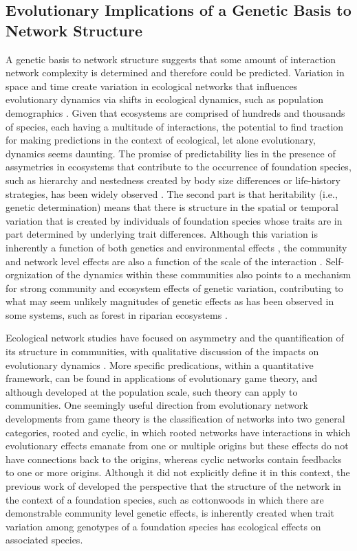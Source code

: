 \documentclass[fleqn,12pt]{olplainarticle}
\begin{document}
\subsection*{Evolutionary Implications of a Genetic Basis to Network Structure}

A genetic basis to network structure suggests that some amount of
interaction network complexity is determined and therefore could be
predicted. Variation in space and time create variation in ecological
networks that influences evolutionary dynamics via shifts in
ecological dynamics, such as population demographics
\cite{Guimaraes2020TheOrganization}. Given that ecosystems are
comprised of hundreds and thousands of species, each having a
multitude of interactions, the potential to find traction for making
predictions in the context of ecological, let alone evolutionary,
dynamics seems daunting. The promise of predictability lies in the
presence of assymetries in ecosystems that contribute to the
occurrence of foundation species, such as hierarchy and nestedness
created by body size differences or life-history strategies, has been
widely observed \cite{Ellison2005}. The second part is that
heritability (i.e., genetic determination) means that there is
structure in the spatial or temporal variation that is created by
individuals of foundation species whose traits are in part determined
by underlying trait differences. Although this variation is inherently
a function of both genetics and environmental effects
\cite{Conner2004ATextbook}, the community and network level effects
are also a function of the scale of the interaction
\cite{Shuster2006COMMUNITYSTRUCTURE}. Self-orgnization of the dynamics
within these communities also points to a mechanism for strong
community and ecosystem effects of genetic variation, contributing to
what may seem unlikely magnitudes of genetic effects as has been
observed in some systems, such as forest in riparian ecosystems
\cite{Bangert2006}.

Ecological network studies have focused on asymmetry and the
quantification of its structure in communities, with qualitative
discussion of the impacts on evolutionary dynamics
\cite{Bascompte2006, Diaz-Castelazo2010, Guimaraes2011,
  Thompson2013}. More specific predications, within a quantitative
framework, can be found in applications of evolutionary game theory,
and although developed at the population scale, such theory can apply
to communities. One seemingly useful direction from evolutionary
network developments from game theory is the classification of
networks into two general categories, rooted and cyclic, in which
rooted networks have interactions in which evolutionary effects
emanate from one or multiple origins but these effects do not have
connections back to the origins, whereas cyclic networks contain
feedbacks to one or more origins. Although it did not explicitly
define it in this context, the previous work of \citep{Lau2017a}
developed the perspective that the structure of the network in the
context of a foundation species, such as cottonwoods in which there
are demonstrable community level genetic effects, is inherently
created when trait variation among genotypes of a foundation species
has ecological effects on associated species.
\end{document}
